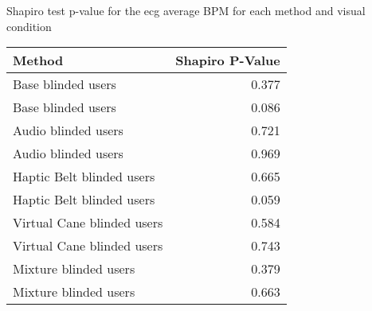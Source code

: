 
\centering
\caption{Shapiro test p-value for the ecg average BPM for each method and visual condition}
\label{tab:shapiro_ecg_bpm}
\begin{tabular}{lr}
\toprule
                    Method &  Shapiro P-Value \\
\midrule
        Base blinded users &            0.377 \\
        Base blinded users &            0.086 \\
       Audio blinded users &            0.721 \\
       Audio blinded users &            0.969 \\
 Haptic Belt blinded users &            0.665 \\
 Haptic Belt blinded users &            0.059 \\
Virtual Cane blinded users &            0.584 \\
Virtual Cane blinded users &            0.743 \\
     Mixture blinded users &            0.379 \\
     Mixture blinded users &            0.663 \\
\bottomrule
\end{tabular}
